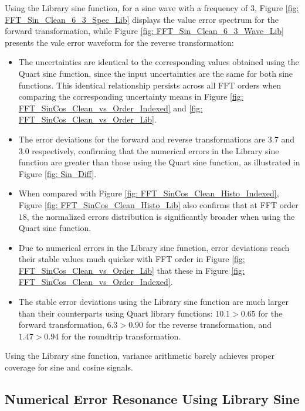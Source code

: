 \documentclass[twoside]{article}
\numberwithin{equation}{section}
\begin{document}
Using the Library sine function, for a sine wave with a frequency of $3$, Figure \ref{fig: FFT_Sin_Clean_6_3_Spec_Lib} displays the value error spectrum for the forward transformation, while Figure \ref{fig: FFT_Sin_Clean_6_3_Wave_Lib} presents the vale error waveform for the reverse transformation:
\begin{itemize}
\item The uncertainties are identical to the corresponding values obtained using the Quart sine function, since the input uncertainties are the same for both sine functions.
This identical relationship persists across all FFT orders when comparing the corresponding uncertainty means in Figure \ref{fig: FFT_SinCos_Clean_vs_Order_Indexed} and \ref{fig: FFT_SinCos_Clean_vs_Order_Lib}.

\item The error deviations for the forward and reverse transformations are $3.7$ and $3.0$ respectively, confirming that the numerical errors in the Library sine function are greater than those using the Quart sine function, as illustrated in Figure \ref{fig: Sin_Diff}.

\item
When compared with Figure \ref{fig: FFT_SinCos_Clean_Histo_Indexed}, Figure \ref{fig: FFT_SinCos_Clean_Histo_Lib} also confirms that at FFT order $18$, the normalized errors distribution is significantly broader when using the Quart sine function.

\item
Due to numerical errors in the Library sine function, error deviations reach their stable values much quicker with FFT order in Figure \ref{fig: FFT_SinCos_Clean_vs_Order_Lib} that these in Figure \ref{fig: FFT_SinCos_Clean_vs_Order_Indexed}.

\item
The stable error deviations using the Library sine function are much larger than their counterparts using Quart library functions: $10.1 > 0.65$ for the forward transformation, $6.3> 0.90$ for the reverse transformation, and $1.47 > 0.94$ for the roundtrip transformation.
\end{itemize}
Using the Library sine function, variance arithmetic barely achieves proper coverage for sine and cosine signals.



\subsection{Numerical Error Resonance Using Library Sine}
\end{document}
